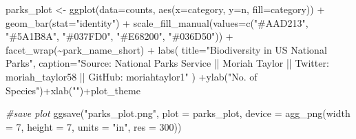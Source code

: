 \documentclass[
]{article}
\newenvironment{Shaded}{\begin{snugshade}}{\end{snugshade}}
\newcommand{\AttributeTok}[1]{\textcolor[rgb]{0.77,0.63,0.00}{#1}}
\newcommand{\CommentTok}[1]{\textcolor[rgb]{0.56,0.35,0.01}{\textit{#1}}}
\newcommand{\DecValTok}[1]{\textcolor[rgb]{0.00,0.00,0.81}{#1}}
\newcommand{\FunctionTok}[1]{\textcolor[rgb]{0.00,0.00,0.00}{#1}}
\newcommand{\NormalTok}[1]{#1}
\newcommand{\OtherTok}[1]{\textcolor[rgb]{0.56,0.35,0.01}{#1}}
\newcommand{\SpecialCharTok}[1]{\textcolor[rgb]{0.00,0.00,0.00}{#1}}
\newcommand{\StringTok}[1]{\textcolor[rgb]{0.31,0.60,0.02}{#1}}
\begin{document}
\begin{Shaded}
\begin{Highlighting}[]
\NormalTok{parks\_plot }\OtherTok{\textless{}{-}} \FunctionTok{ggplot}\NormalTok{(}\AttributeTok{data=}\NormalTok{counts, }\FunctionTok{aes}\NormalTok{(}\AttributeTok{x=}\NormalTok{category, }\AttributeTok{y=}\NormalTok{n, }\AttributeTok{fill=}\NormalTok{category)) }\SpecialCharTok{+} 
  \FunctionTok{geom\_bar}\NormalTok{(}\AttributeTok{stat=}\StringTok{"identity"}\NormalTok{) }\SpecialCharTok{+}
  \FunctionTok{scale\_fill\_manual}\NormalTok{(}\AttributeTok{values=}\FunctionTok{c}\NormalTok{(}\StringTok{"\#AAD213"}\NormalTok{, }\StringTok{"\#5A1B8A"}\NormalTok{, }\StringTok{"\#037FD0"}\NormalTok{, }\StringTok{"\#E68200"}\NormalTok{, }\StringTok{"\#036D50"}\NormalTok{)) }\SpecialCharTok{+}
  \FunctionTok{facet\_wrap}\NormalTok{(}\SpecialCharTok{\textasciitilde{}}\NormalTok{park\_name\_short) }\SpecialCharTok{+}
  \FunctionTok{labs}\NormalTok{(}
    \AttributeTok{title=}\StringTok{"Biodiversity in US National Parks"}\NormalTok{,}
    \AttributeTok{caption=}\StringTok{"Source: National Parks Service  ||  Moriah Taylor  ||  Twitter: moriah\_taylor58  ||  GitHub: moriahtaylor1"}
\NormalTok{  ) }\SpecialCharTok{+}\FunctionTok{ylab}\NormalTok{(}\StringTok{"No. of Species"}\NormalTok{)}\SpecialCharTok{+}\FunctionTok{xlab}\NormalTok{(}\StringTok{""}\NormalTok{)}\SpecialCharTok{+}\NormalTok{plot\_theme}

\CommentTok{\#save plot}
\FunctionTok{ggsave}\NormalTok{(}\StringTok{"parks\_plot.png"}\NormalTok{,}
       \AttributeTok{plot =}\NormalTok{ parks\_plot,}
       \AttributeTok{device =} \FunctionTok{agg\_png}\NormalTok{(}\AttributeTok{width =} \DecValTok{7}\NormalTok{, }\AttributeTok{height =} \DecValTok{7}\NormalTok{, }\AttributeTok{units =} \StringTok{"in"}\NormalTok{, }\AttributeTok{res =} \DecValTok{300}\NormalTok{))}
\end{Highlighting}
\end{Shaded}
\end{document}
